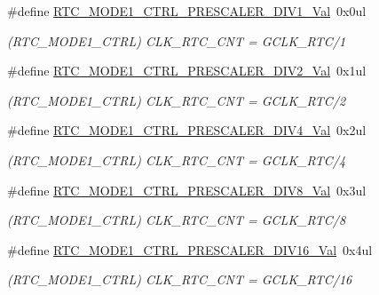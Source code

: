 \begin{DoxyCompactItemize}
\item 
\#define \mbox{\hyperlink{group___s_a_m_d21___r_t_c_ga6ca17444586d0f47860a5b37b620c2fb}{R\+T\+C\+\_\+\+M\+O\+D\+E1\+\_\+\+C\+T\+R\+L\+\_\+\+P\+R\+E\+S\+C\+A\+L\+E\+R\+\_\+\+D\+I\+V1\+\_\+\+Val}}~0x0ul
\begin{DoxyCompactList}\small\item\em (R\+T\+C\+\_\+\+M\+O\+D\+E1\+\_\+\+C\+T\+RL) C\+L\+K\+\_\+\+R\+T\+C\+\_\+\+C\+NT = G\+C\+L\+K\+\_\+\+R\+T\+C/1 \end{DoxyCompactList}\item 
\#define \mbox{\hyperlink{group___s_a_m_d21___r_t_c_ga5139ae4965ed737224a36d45cf595d32}{R\+T\+C\+\_\+\+M\+O\+D\+E1\+\_\+\+C\+T\+R\+L\+\_\+\+P\+R\+E\+S\+C\+A\+L\+E\+R\+\_\+\+D\+I\+V2\+\_\+\+Val}}~0x1ul
\begin{DoxyCompactList}\small\item\em (R\+T\+C\+\_\+\+M\+O\+D\+E1\+\_\+\+C\+T\+RL) C\+L\+K\+\_\+\+R\+T\+C\+\_\+\+C\+NT = G\+C\+L\+K\+\_\+\+R\+T\+C/2 \end{DoxyCompactList}\item 
\#define \mbox{\hyperlink{group___s_a_m_d21___r_t_c_ga0bdab1ac69994f62919f3fc9945b3462}{R\+T\+C\+\_\+\+M\+O\+D\+E1\+\_\+\+C\+T\+R\+L\+\_\+\+P\+R\+E\+S\+C\+A\+L\+E\+R\+\_\+\+D\+I\+V4\+\_\+\+Val}}~0x2ul
\begin{DoxyCompactList}\small\item\em (R\+T\+C\+\_\+\+M\+O\+D\+E1\+\_\+\+C\+T\+RL) C\+L\+K\+\_\+\+R\+T\+C\+\_\+\+C\+NT = G\+C\+L\+K\+\_\+\+R\+T\+C/4 \end{DoxyCompactList}\item 
\#define \mbox{\hyperlink{group___s_a_m_d21___r_t_c_ga4b9e0f566951e8e4206feff74086a57b}{R\+T\+C\+\_\+\+M\+O\+D\+E1\+\_\+\+C\+T\+R\+L\+\_\+\+P\+R\+E\+S\+C\+A\+L\+E\+R\+\_\+\+D\+I\+V8\+\_\+\+Val}}~0x3ul
\begin{DoxyCompactList}\small\item\em (R\+T\+C\+\_\+\+M\+O\+D\+E1\+\_\+\+C\+T\+RL) C\+L\+K\+\_\+\+R\+T\+C\+\_\+\+C\+NT = G\+C\+L\+K\+\_\+\+R\+T\+C/8 \end{DoxyCompactList}\item 
\#define \mbox{\hyperlink{group___s_a_m_d21___r_t_c_gae03a9107edd04d0825cce744ae99b393}{R\+T\+C\+\_\+\+M\+O\+D\+E1\+\_\+\+C\+T\+R\+L\+\_\+\+P\+R\+E\+S\+C\+A\+L\+E\+R\+\_\+\+D\+I\+V16\+\_\+\+Val}}~0x4ul
\begin{DoxyCompactList}\small\item\em (R\+T\+C\+\_\+\+M\+O\+D\+E1\+\_\+\+C\+T\+RL) C\+L\+K\+\_\+\+R\+T\+C\+\_\+\+C\+NT = G\+C\+L\+K\+\_\+\+R\+T\+C/16 \end{DoxyCompactList}\item 

\end{DoxyCompactItemize}
